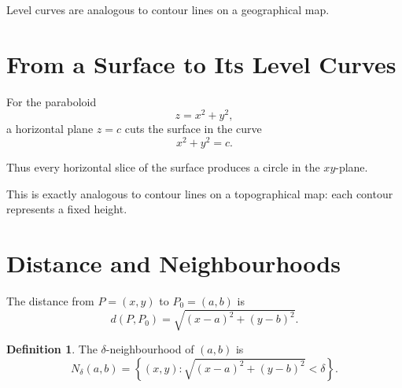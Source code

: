 \documentclass[11pt,oneside]{book}
\theoremstyle{studentthm}
\theoremstyle{definition}
\newtheorem{definition}[theorem]{Definition}
\begin{document}
Level curves are analogous to contour lines on a geographical map.


\section{From a Surface to Its Level Curves}

For the paraboloid
\[
z=x^2+y^2,
\]
a horizontal plane \(z=c\) cuts the surface in the curve
\[
x^2+y^2=c.
\]

Thus every horizontal slice of the surface produces a circle in the
\(xy\)-plane.

\begin{center}

\vspace{2mm}

\end{center}

This is exactly analogous to contour lines on a topographical map:
each contour represents a fixed height.


\section{Distance and Neighbourhoods}

The distance from \(P=(x,y)\) to \(P_0=(a,b)\) is
\[
d(P,P_0)
=
\sqrt{(x-a)^2+(y-b)^2}.
\]

\begin{definition}
The \(\delta\)-neighbourhood of \((a,b)\) is
\[
N_\delta(a,b)
=
\left\{
(x,y):
\sqrt{(x-a)^2+(y-b)^2}<\delta
\right\}.
\]
\end{definition}
\end{document}
